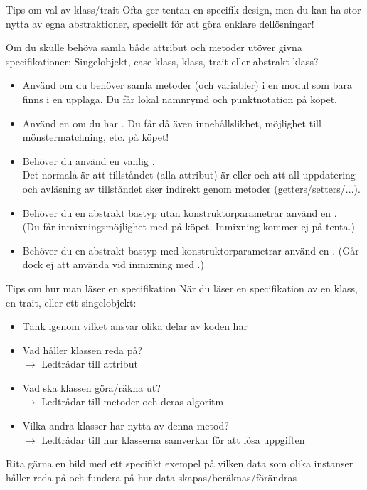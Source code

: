 

\begin{Slide}{Tips om val av klass/trait}\SlideFontSmall
Ofta ger tentan en specifik design, men du kan ha stor nytta av egna abstraktioner, speciellt  för att göra enklare dellösningar!

\pause\vspace{1em}Om du skulle behöva samla både attribut och metoder utöver givna specifikationer:
Singelobjekt, case-klass, klass, trait eller abstrakt klass?
\begin{itemize}\SlideFontTiny
\item Använd  om du behöver samla metoder (och variabler) i en modul som bara finns i en upplaga. Du får lokal namnrymd och punktnotation på köpet.
\item Använd en  om du har . Du får då även innehållslikhet, möjlighet till mönstermatchning, etc. på köpet! 
\item Behöver du  använd en vanlig .\\ Det normala är att tillståndet (alla attribut) är  eller  och att all uppdatering och avläsning av tillståndet sker indirekt genom metoder (getters/setters/...). 
\item Behöver du en abstrakt bastyp utan konstruktorparametrar använd en . \\(Du får inmixningsmöjlighet med  på köpet. Inmixning kommer ej på tenta.)
\item Behöver du en abstrakt bastyp med konstruktorparametrar använd en . (Går dock ej att använda vid inmixning med .)
\end{itemize}
\end{Slide}


\begin{Slide}{Tips om hur man läser en specifikation}\SlideFontSmall
När du läser en specifikation av en klass, en trait, eller ett singelobjekt:
\begin{itemize}
\item Tänk igenom vilket ansvar olika delar av koden har
\item Vad håller klassen reda på? \\$\rightarrow$ Ledtrådar till attribut
\item Vad ska klassen göra/räkna ut? \\$\rightarrow$ Ledtrådar till metoder och deras algoritm
\item Vilka andra klasser har nytta av denna metod? \\$\rightarrow$ Ledtrådar till hur klasserna samverkar för att lösa uppgiften
\end{itemize}
Rita gärna en bild med ett specifikt exempel på vilken data som olika instanser håller reda på och fundera på hur data skapas/beräknas/förändras
\end{Slide}


